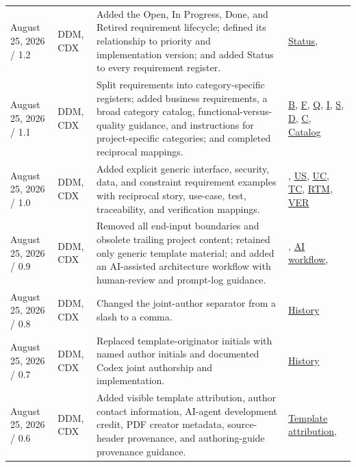 \begin{tabularx}{\linewidth}{L{3.1cm}L{2.2cm}YL{2.0cm}}
August 25, 2026 / 1.2 & DDM, CDX & Added the Open, In Progress, Done, and Retired requirement lifecycle; defined its relationship to priority and implementation version; and added Status to every requirement register. & \hyperref[Table:RequirementStatusDefinitions]{Status}, \\
August 25, 2026 / 1.1 & DDM, CDX & Split requirements into category-specific registers; added business requirements, a broad category catalog, functional-versus-quality guidance, and instructions for project-specific categories; and completed reciprocal mappings. & \hyperref[Table:BusinessRequirements]{B}, \hyperref[Table:FunctionalRequirements]{F}, \hyperref[Table:QualityRequirements]{Q}, \hyperref[Table:InterfaceRequirements]{I}, \hyperref[Table:SecurityRequirements]{S}, \hyperref[Table:DataRequirements]{D}, \hyperref[Table:ConstraintRequirements]{C}, \hyperref[Table:RequirementCategoryCatalog]{Catalog}\\
August 25, 2026 / 1.0 & DDM, CDX & Added explicit generic interface, security, data, and constraint requirement examples with reciprocal story, use-case, test, traceability, and verification mappings. & , \hyperref[Table:UserStories]{US}, \hyperref[Chapter:UseCases]{UC}, \hyperref[Chapter:Tests]{TC}, \hyperref[Table:TraceabilityMatrix]{RTM}, \hyperref[Table:VerificationRegister]{VER}\\
August 25, 2026 / 0.9 & DDM, CDX & Removed all end-input boundaries and obsolete trailing project content; retained only generic template material; and added an AI-assisted architecture workflow with human-review and prompt-log guidance. & , \hyperref[Section:AIArchitectureWorkflow]{AI workflow}, \\
August 25, 2026 / 0.8 & DDM, CDX & Changed the joint-author separator from a slash to a comma. & \hyperref[Table:DocumentHistory]{History}\\
August 25, 2026 / 0.7 & DDM, CDX & Replaced template-originator initials with named author initials and documented Codex joint authorship and implementation. & \hyperref[Table:DocumentHistory]{History}\\
August 25, 2026 / 0.6 & DDM, CDX & Added visible template attribution, author contact information, AI-agent development credit, PDF creator metadata, source-header provenance, and authoring-guide provenance guidance. & \hyperref[Chapter:TemplateAttribution]{Template attribution}, \\

\end{tabularx}
